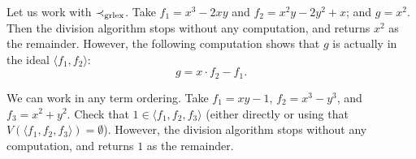 \documentclass[11pt]{article}
\begin{document}
\begin{example}
  \label{eq:fail1}
  Let us work with $\prec_{\rm grlex}$.
  Take $f_1  = x^3-2xy$ and $f_2 = x^2y-2y^2+x$; and $g = x^2$.
  Then the division algorithm stops without any computation, and returns $x^2$ as the remainder.
  However, the following computation shows that $g$ is actually in the ideal $\langle  f_1, f_2 \rangle$:
  \[ g = x \cdot f_2 - f_1.\]
\end{example}

\begin{example}
  We can work in any term ordering.
  Take $f_1 = xy-1$, $f_2 = x^3-y^3$, and $f_3 = x^2+y^2$.
  Check that $1 \in \langle  f_1, f_2, f_3 \rangle$ (either directly or using that $V(\langle  f_1, f_2, f_3 \rangle) = \emptyset$).
  However, the division algorithm stops without any computation, and returns $1$ as the remainder.
\end{example}
\end{document}
